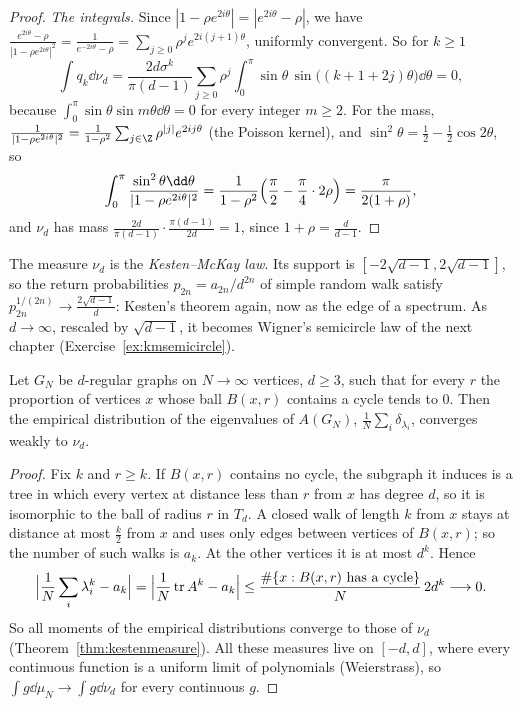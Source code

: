 \begin{proof}
\emph{The integrals.} Since $|1-\rho e^{2i\theta}|=|e^{2i\theta}-\rho|$, we have $\frac{e^{2i\theta}-\rho}{|1-\rho e^{2i\theta}|^2}=\frac1{e^{-2i\theta}-\rho}=\sum_{j\ge0}\rho^je^{2i(j+1)\theta}$, uniformly convergent. So for $k\ge1$
\[
\int q_k\dd\nu_d=\frac{2d\sigma^k}{\pi(d-1)}\sum_{j\ge0}\rho^j\int_0^\pi\sin\theta\,\sin\bigl((k+1+2j)\theta\bigr)\dd\theta=0 ,
\]
because $\int_0^\pi\sin\theta\sin m\theta\dd\theta=0$ for every integer $m\ge2$. For the mass, $\frac1{|1-\rho e^{2i\theta}|^2}=\frac1{1-\rho^2}\sum_{j\in\Z}\rho^{|j|}e^{2ij\theta}$ (the Poisson kernel), and $\sin^2\theta=\frac12-\frac12\cos2\theta$, so
\[
\int_0^\pi\frac{\sin^2\theta\dd\theta}{|1-\rho e^{2i\theta}|^2}=\frac1{1-\rho^2}\Bigl(\frac\pi2-\frac\pi4\cdot2\rho\Bigr)=\frac\pi{2(1+\rho)} ,
\]
and $\nu_d$ has mass $\frac{2d}{\pi(d-1)}\cdot\frac{\pi(d-1)}{2d}=1$, since $1+\rho=\frac d{d-1}$.
\end{proof}

The measure $\nu_d$ is the \emph{Kesten--McKay law}. Its support is $[-2\sqrt{d-1},2\sqrt{d-1}]$, so the return probabilities $p_{2n}=a_{2n}/d^{2n}$ of simple random walk satisfy $p_{2n}^{1/(2n)}\to\frac{2\sqrt{d-1}}d$: Kesten's
theorem again, now as the edge of a spectrum. As $d\to\infty$, rescaled by $\sqrt{d-1}$, it becomes Wigner's semicircle law of the next chapter (Exercise~\ref{ex:kmsemicircle}).

\begin{theorem}[McKay, 1981]\label{thm:mckay}
Let $G_N$ be $d$-regular graphs on $N\to\infty$ vertices, $d\ge3$, such that for every $r$ the proportion of vertices $x$ whose ball $B(x,r)$ contains a cycle tends to $0$. Then the empirical distribution of the
eigenvalues of $A(G_N)$, $\frac1N\sum_i\delta_{\lambda_i}$, converges weakly to $\nu_d$.
\end{theorem}

\begin{proof}
Fix $k$ and $r\ge k$. If $B(x,r)$ contains no cycle, the subgraph it induces is a tree in which every vertex at distance less than $r$ from $x$ has degree $d$, so it is isomorphic to the ball of radius $r$ in $T_d$. A
closed walk of length $k$ from $x$ stays at distance at most $\frac k2$ from $x$ and uses only edges between vertices of $B(x,r)$; so the number of such walks is $a_k$. At the other vertices it is at most $d^k$. Hence
\[
\Bigl|\frac1N\sum_i\lambda_i^k-a_k\Bigr|=\Bigl|\frac1N\operatorname{tr}A^k-a_k\Bigr|\le\frac{\#\{x:B(x,r)\text{ has a cycle}\}}N\,2d^k\longrightarrow0.
\]
So all moments of the empirical distributions converge to those of $\nu_d$ (Theorem~\ref{thm:kestenmeasure}). All these measures live on $[-d,d]$, where every continuous function is a uniform limit of polynomials
(Weierstrass), so $\int g\dd\mu_N\to\int g\dd\nu_d$ for every continuous $g$.
\end{proof}

